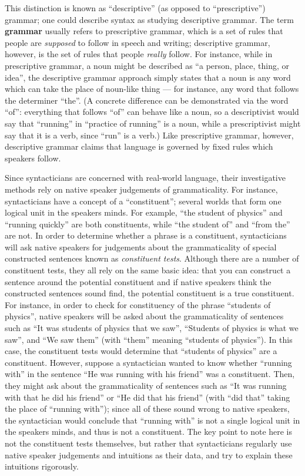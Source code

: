 \documentclass[twocolumn]{article}
\begin{document}
This distinction is known as ``descriptive'' (as opposed to ``prescriptive'') grammar; one could
describe syntax as studying descriptive grammar. The term \textbf{grammar} usually refers to
prescriptive grammar, which is a set of rules that people are \emph{supposed} to follow in speech
and writing; descriptive grammar, however, is the set of rules that people \emph{really} follow. For
instance, while in prescriptive grammar, a noun might be described as ``a person, place, thing, or
idea'', the descriptive grammar approach simply states that a noun is any word which can take the
place of noun-like thing --- for instance, any word that follows the determiner ``the''. (A concrete
difference can be demonstrated via the word ``of'': everything that follows ``of'' can behave like
a noun, so a descriptivist would say that ``running'' in ``practice of running'' is a noun, while a
prescriptivist might say that it is a verb, since ``run'' is a verb.) Like prescriptive grammar,
however, descriptive grammar claims that language is governed by fixed rules which speakers follow.

Since syntacticians are concerned with real-world language, their investigative methods rely on
native speaker judgements of grammaticality. For instance, syntacticians have a concept of a
``constituent''; several worlds that form one logical unit in the speakers minds. For example, ``the
student of physics'' and ``running quickly'' are both constituents, while ``the student of'' and
``from the'' are not. In order to determine whether a phrase is a constituent, syntacticians will
ask native speakers for judgements about the grammaticality of special constructed sentences known
as \emph{constituent tests}. Although there are a number of constituent tests, they all rely on the
same basic idea: that you can construct a sentence around the potential constituent and if native
speakers think the constructed sentences sound find, the potential constituent is a true
constituent. For instance, in order to check for constituency of the phrase ``students of physics'',
native speakers will be asked about the grammaticality of sentences such as ``It was students of
physics that we saw'', ``Students of physics is what we saw'', and ``We saw them'' (with ``them''
meaning ``students of physics''). In this case, the constituent tests would determine that
``students of physics'' are a constituent. However, suppose a syntactician wanted to know whether
``running with'' in the sentence ``He was running with his friend'' was a constituent. Then, they
might ask about the grammaticality of sentences such as ``It was running with that he did his
friend'' or ``He did that his friend'' (with ``did that'' taking the place of ``running with'');
since all of these sound wrong to native speakers, the syntactician would conclude that ``running
with'' is not a single logical unit in the speakers minds, and thus is not a constituent. The key
point to note here is not the constituent tests themselves, but rather that syntacticians regularly
use native speaker judgements and intuitions as their data, and try to explain these intuitions
rigorously.
\end{document}
